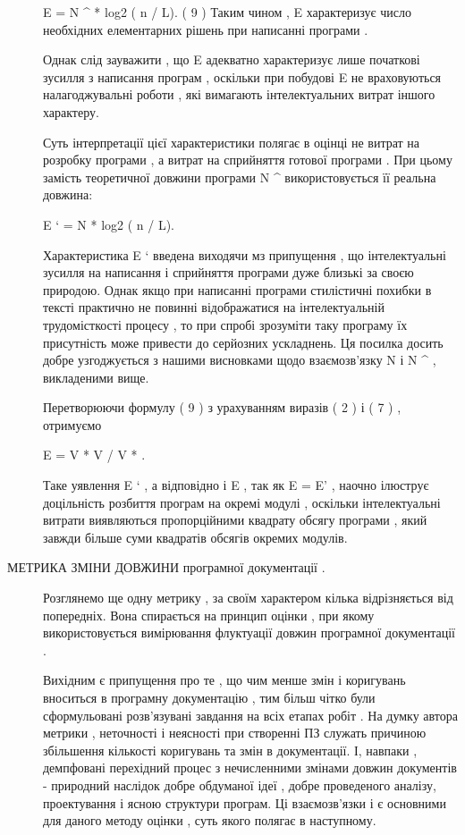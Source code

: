 \documentclass[oneside,final,14pt]{extreport}
\begin{document}
\begin{description}
E = N \textasciicircum{} * log2 ( n / L). ( 9 )
Таким чином , E характеризує число необхідних елементарних рішень при написанні програми .

Однак слід зауважити , що E адекватно характеризує лише початкові зусилля з написання програм , оскільки при побудові E не враховуються налагоджувальні роботи , які вимагають інтелектуальних витрат іншого характеру.

Суть інтерпретації цієї характеристики полягає в оцінці не витрат на розробку програми , а витрат на сприйняття готової програми . При цьому замість теоретичної довжини програми N \textasciicircum{} використовується її реальна довжина:

E ` = N * log2 ( n / L).

Характеристика E ` введена виходячи мз припущення , що інтелектуальні зусилля на написання і сприйняття програми дуже близькі за своєю природою. Однак якщо при написанні програми стилістичні похибки в тексті практично не повинні відображатися на інтелектуальній трудомісткості процесу , то при спробі зрозуміти таку програму їх присутність може привести до серйозних ускладнень. Ця посилка досить добре узгоджується з нашими висновками щодо взаємозв'язку N і N \textasciicircum{} , викладеними вище.

Перетворюючи формулу ( 9 ) з урахуванням виразів ( 2 ) і ( 7 ) , отримуємо

E = V * V / V * .

Таке уявлення E ` , а відповідно і E , так як E = E' , наочно ілюструє доцільність розбиття програм на окремі модулі , оскільки інтелектуальні витрати виявляються пропорційними квадрату обсягу програми , який завжди більше суми квадратів обсягів окремих модулів.

\item[{МЕТРИКА ЗМІНИ ДОВЖИНИ програмної документації .}] \leavevmode
Розглянемо ще одну метрику , за своїм характером кілька відрізняється від попередніх. Вона спирається на принцип оцінки , при якому використовується вимірювання флуктуації довжин програмної документації .

Вихідним є припущення про те , що чим менше змін і коригувань вноситься в програмну документацію , тим більш чітко були сформульовані розв'язувані завдання на всіх етапах робіт . На думку автора метрики , неточності і неясності при створенні ПЗ служать причиною збільшення кількості коригувань та змін в документації. І, навпаки , демпфовані перехідний процес з нечисленними змінами довжин документів - природний наслідок добре обдуманої ідеї , добре проведеного аналізу, проектування і ясною структури програм. Ці взаємозв'язки і є основними для даного методу оцінки , суть якого полягає в наступному.


\end{description}
\end{document}
